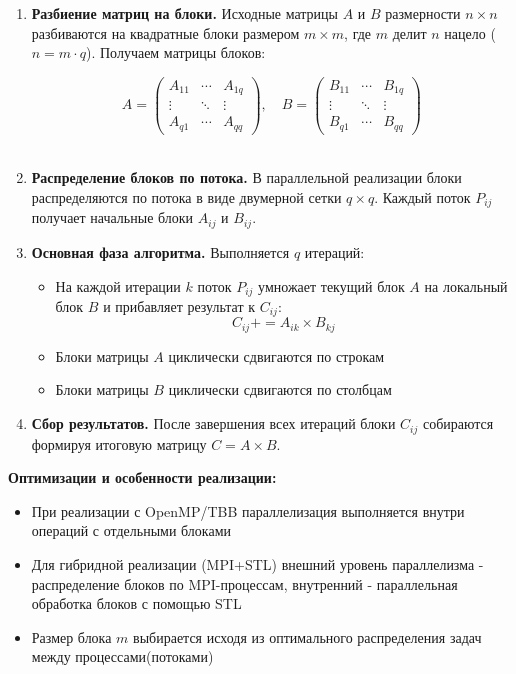 \documentclass[12pt]{article}
\begin{document}
\begin{enumerate}
    \item \textbf{Разбиение матриц на блоки.} Исходные матрицы $A$ и $B$ размерности $n \times n$ разбиваются на квадратные блоки размером $m \times m$, где $m$ делит $n$ нацело ($n = m \cdot q$). Получаем матрицы блоков:
    
    \[
    A = \begin{pmatrix}
    A_{11} & \cdots & A_{1q} \\
    \vdots & \ddots & \vdots \\
    A_{q1} & \cdots & A_{qq}
    \end{pmatrix}, \quad
    B = \begin{pmatrix}
    B_{11} & \cdots & B_{1q} \\
    \vdots & \ddots & \vdots \\
    B_{q1} & \cdots & B_{qq}
    \end{pmatrix}
    \]\\
    
    \item \textbf{Распределение блоков по потока.} В параллельной реализации блоки распределяются по потока в виде двумерной сетки $q \times q$. Каждый поток $P_{ij}$ получает начальные блоки $A_{ij}$ и $B_{ij}$.
    
    \item \textbf{Основная фаза алгоритма.} Выполняется $q$ итераций:
    \begin{itemize}
        \item На каждой итерации $k$ поток $P_{ij}$ умножает текущий блок $A$ на локальный блок $B$ и прибавляет результат к $C_{ij}$:
        \[ C_{ij} += A_{ik} \times B_{kj} \]
        
        \item Блоки матрицы $A$ циклически сдвигаются по строкам
        
        \item Блоки матрицы $B$ циклически сдвигаются по столбцам
    \end{itemize}
    
    \item \textbf{Сбор результатов.} После завершения всех итераций блоки $C_{ij}$ собираются формируя итоговую матрицу $C = A \times B$.
\end{enumerate}
\par
\textbf{Оптимизации и особенности реализации:}

\begin{itemize}
    \item При реализации с OpenMP/TBB параллелизация выполняется внутри операций с отдельными блоками
    
    \item Для гибридной реализации (MPI+STL) внешний уровень параллелизма - распределение блоков по MPI-процессам, внутренний - параллельная обработка блоков с помощью STL
    
    \item Размер блока $m$ выбирается исходя из оптимального распределения задач между процессами(потоками)
\end{itemize}
\end{document}
